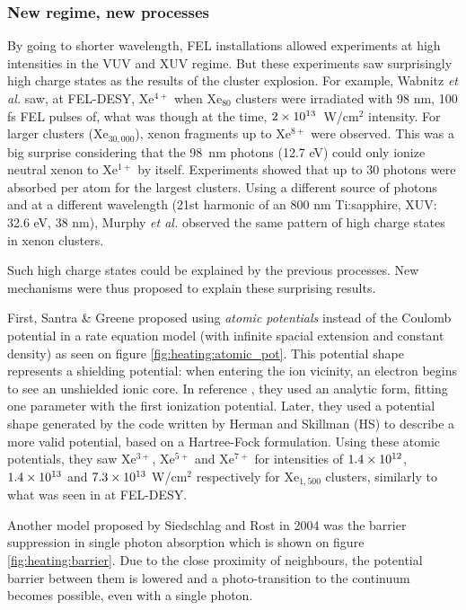 \subsubsection{New regime, new processes}

By going to shorter wavelength, FEL installations allowed experiments at high
intensities in the VUV and XUV regime. But these experiments saw surprisingly
high charge states as the results of the cluster
explosion\cite{Wabnitz2002,Bostedt2010}. For example, Wabnitz \textit{et al.}
saw, at FEL-DESY, Xe$^{4+}$ when Xe$_{80}$ clusters were irradiated with 98 nm,
100 fs FEL pulses of, what was though at the time, $\ten{2}{13}$~W/cm$^2$
intensity. For larger clusters (Xe$_{30,000}$), xenon fragments up to
Xe$^{8+}$ were observed. This was a big surprise considering that the 98~nm
photons (12.7 eV) could only ionize neutral xenon to Xe$^{1+}$ by itself.
Experiments showed that up to 30 photons were absorbed per atom for the largest
clusters. Using a different source of photons and at a different wavelength
(21st harmonic of an 800 nm Ti:sapphire, XUV: 32.6 eV, 38 nm),
Murphy \textit{et al.} observed the same pattern of high charge states in xenon
clusters\cite{Murphy2008a,Murphy2008b}.

Such high charge states could be explained by the previous processes. New
mechanisms were thus proposed to explain these surprising results.


First, Santra \& Greene proposed using \textit{atomic potentials} instead of
the Coulomb potential in a rate equation model (with infinite spacial
extension and
constant density) as seen on figure \ref{fig:heating:atomic_pot}.
This potential shape represents a shielding potential: when
entering the ion vicinity, an electron begins to see an unshielded ionic core.
In reference \cite{Greene2003}, they used an analytic form, fitting one
parameter
with the first ionization potential. Later\cite{Walters2006}, they used a
potential shape generated by the code written by Herman and
Skillman\cite{HS1963} (HS) to describe a more valid potential, based on a
Hartree-Fock formulation. Using these atomic potentials, they saw Xe$^{3+}$,
Xe$^{5+}$ and Xe$^{7+}$ for intensities of $\ten{1.4}{12}$, $\ten{1.4}{13}$ and
$\ten{7.3}{13}$ W/cm$^2$ respectively for Xe$_{1,500}$ clusters, similarly to
what was seen in at FEL-DESY.

Another model proposed by Siedschlag and Rost\cite{Siedschlag2004} in 2004 was
the barrier suppression in single photon absorption which is shown on figure
\ref{fig:heating:barrier}. Due to the close proximity
of neighbours, the potential barrier between them is lowered and
a photo-transition to the continuum becomes possible, even with a single photon.


